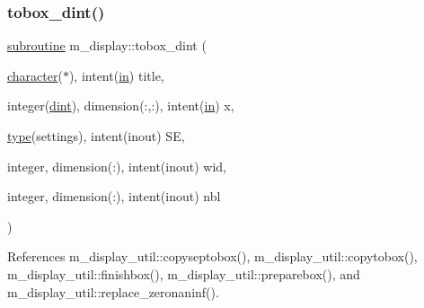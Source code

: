\subsubsection{\texorpdfstring{tobox\+\_\+dint()}{tobox\_dint()}}
{\footnotesize\ttfamily \hyperlink{M__stopwatch_83_8txt_acfbcff50169d691ff02d4a123ed70482}{subroutine} m\+\_\+display\+::tobox\+\_\+dint (\begin{DoxyParamCaption}\item[{\hyperlink{option__stopwatch_83_8txt_abd4b21fbbd175834027b5224bfe97e66}{character}($\ast$), intent(\hyperlink{M__journal_83_8txt_afce72651d1eed785a2132bee863b2f38}{in})}]{title,  }\item[{integer(\hyperlink{namespacem__display_a73f772e9702cad6f40b78364fde2c7cd}{dint}), dimension(\+:,\+:), intent(\hyperlink{M__journal_83_8txt_afce72651d1eed785a2132bee863b2f38}{in})}]{x,  }\item[{\hyperlink{stop__watch_83_8txt_a70f0ead91c32e25323c03265aa302c1c}{type}(settings), intent(inout)}]{SE,  }\item[{integer, dimension(\+:), intent(inout)}]{wid,  }\item[{integer, dimension(\+:), intent(inout)}]{nbl }\end{DoxyParamCaption})\hspace{0.3cm}{\ttfamily [private]}}



References m\+\_\+display\+\_\+util\+::copyseptobox(), m\+\_\+display\+\_\+util\+::copytobox(), m\+\_\+display\+\_\+util\+::finishbox(), m\+\_\+display\+\_\+util\+::preparebox(), and m\+\_\+display\+\_\+util\+::replace\+\_\+zeronaninf().

\mbox{\label{namespacem__display_abaf23628781d863ca3d9bba0b3b01707}} 
